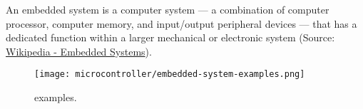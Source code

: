 \documentclass[aspectratio=169]{beamer}
\begin{document}
\begin{frame}
    \begin{definition}
        An embedded system is a computer system --- a combination of computer processor, computer memory, and input/output peripheral devices --- that has a dedicated function within a larger mechanical or electronic system (Source: \href{https://en.wikipedia.org/wiki/Embedded_system}{Wikipedia - Embedded Systems}).
    \end{definition}
    \vspace{-1em}
    \begin{figure}
        \texttt{[image: microcontroller/embedded-system-examples.png]}
        \caption{ examples.}
    \end{figure}
\end{frame}


\subsection{}
\end{document}
